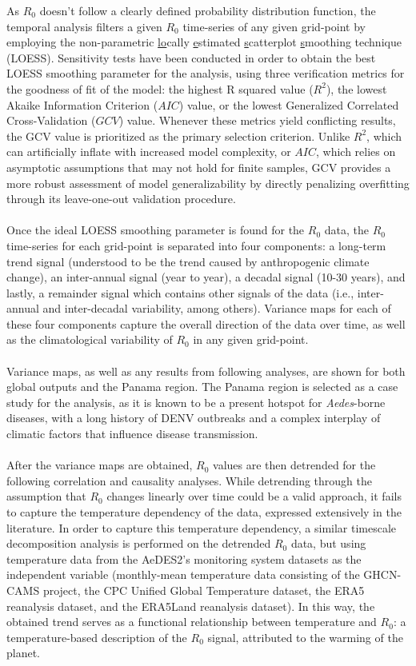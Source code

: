 \documentclass[article,10pt,twocolumn]{wlscirep}
\begin{document}
As $R_0$ doesn't follow a clearly defined probability distribution function, the temporal analysis filters a given $R_0$ time-series of any given grid-point by employing the non-parametric \underline{lo}cally \underline{e}stimated \underline{s}catterplot \underline{s}moothing technique (LOESS). Sensitivity tests have been conducted in order to obtain the best LOESS smoothing parameter for the analysis, using three verification metrics for the goodness of fit of the model: the highest R squared value ($R^2$), the lowest Akaike Information Criterion ($AIC$) value, or the lowest Generalized Correlated Cross-Validation ($GCV$) value. Whenever these metrics yield conflicting results, the GCV value is prioritized as the primary selection criterion. Unlike $R^2$, which can artificially inflate with increased model complexity, or $AIC$, which relies on asymptotic assumptions that may not hold for finite samples, GCV provides a more robust assessment of model generalizability by directly penalizing overfitting through its leave-one-out validation procedure.
\\
\\
Once the ideal LOESS smoothing parameter is found for the $R_0$ data, the $R_0$ time-series for each grid-point is separated into four components: a long-term trend signal (understood to be the trend caused by anthropogenic climate change), an inter-annual signal (year to year), a decadal signal (10-30 years), and lastly, a remainder signal which contains other signals of the data (i.e., inter-annual and inter-decadal variability, among others). Variance maps for each of these four components capture the overall direction of the data over time, as well as the climatological variability of $R_0$ in any given grid-point.
\\
\\
Variance maps, as well as any results from following analyses, are shown for both global outputs and the Panama region. The Panama region is selected as a case study for the analysis, as it is known to be a present hotspot for \textit{Aedes}-borne diseases, with a long history of DENV outbreaks and a complex interplay of climatic factors that influence disease transmission.
\\
\\
After the variance maps are obtained, $R_0$ values are then detrended for the following correlation and causality analyses. While detrending through the assumption that $R_0$ changes linearly over time could be a valid approach, it fails to capture the temperature dependency of the data, expressed extensively in the literature. In order to capture this temperature dependency, a similar timescale decomposition analysis is performed on the detrended $R_0$ data, but using temperature data from the AeDES2's monitoring system datasets as the independent variable (monthly-mean temperature data consisting of the GHCN-CAMS project, the CPC Unified Global Temperature dataset, the ERA5 reanalysis dataset, and the ERA5Land reanalysis dataset). In this way, the obtained trend serves as a functional relationship between temperature and $R_0$: a temperature-based description of the $R_0$ signal, attributed to the warming of the planet.
\end{document}
